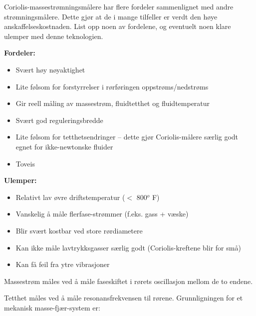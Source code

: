 

Coriolis-massestrømningsmålere har flere fordeler sammenlignet med andre strømningsmålere. Dette gjør at de i mange tilfeller er verdt den høye anskaffelseskostnaden. List opp noen av fordelene, og eventuelt noen klare ulemper med denne teknologien.







{\bf Fordeler:}

\begin{itemize}
\item{} Svært høy nøyaktighet
\item{} Lite følsom for forstyrrelser i rørføringen oppstrøms/nedstrøms
\item{} Gir reell måling av massestrøm, fluidtetthet og fluidtemperatur
\item{} Svært god reguleringsbredde
\item{} Lite følsom for tetthetsendringer -- dette gjør Coriolis-målere særlig godt egnet for ikke-newtonske fluider
\item{} Toveis
\end{itemize}

\vskip 10pt

{\bf Ulemper:}

\begin{itemize}
\item{} Relativt lav øvre driftstemperatur ($<$ 800$^{o}$ F)
\item{} Vanskelig å måle flerfase-strømmer (f.eks. gass + væske)
\item{} Blir svært kostbar ved store rørdiametere
\item{} Kan ikke måle lavtrykksgasser særlig godt (Coriolis-kreftene blir for små)
\item{} Kan få feil fra ytre vibrasjoner
\end{itemize}

\vskip 10pt

Massestrøm måles ved å måle faseskiftet i rørets oscillasjon mellom de to endene.

Tetthet måles ved å måle resonansfrekvensen til rørene. Grunnligningen for et mekanisk masse-fjær-system er:

